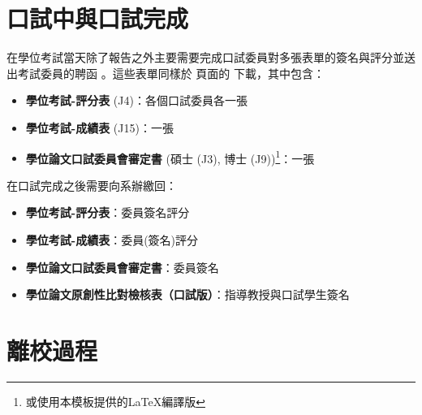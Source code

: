\documentclass[12pt]{report}
\theoremstyle{plain}
\begin{document}
\section{口試中與口試完成}

在學位考試當天除了報告之外主要需要完成口試委員對多張表單的簽名與評分並送出考試委員的聘函 \cite{ntutlibgraduate}。這些表單同樣於 \cite{ntutsheet} 頁面的  下載，其中包含：
\begin{itemize}
    \item \textbf{學位考試-評分表} (J4)：各個口試委員各一張
    \item \textbf{學位考試-成績表} (J15)：一張
    \item \textbf{學位論文口試委員會審定書} (碩士 (J3), 博士 (J9))\footnote{或使用本模板提供的\LaTeX 編譯版}：一張
\end{itemize}
在口試完成之後需要向系辦繳回：
\begin{itemize}
    \item \textbf{學位考試-評分表}：委員簽名評分
    \item \textbf{學位考試-成績表}：委員(簽名)評分
    \item \textbf{學位論文口試委員會審定書}：委員簽名
    \item \textbf{學位論文原創性比對檢核表{（口試版）}}：指導教授與口試學生簽名
\end{itemize}

\section{離校過程}
\end{document}

